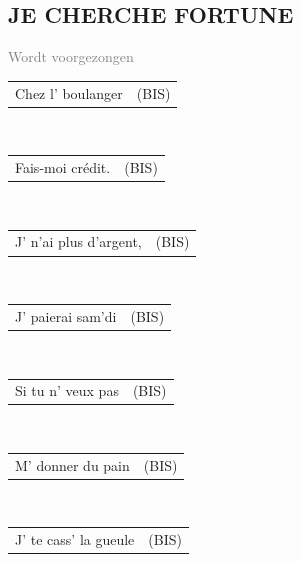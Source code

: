\documentclass[a4paper, 14pt]{extarticle}
\newcommand{\spacing}{2mm}
\begin{document}
\subsection*{JE CHERCHE FORTUNE}
\textcolor{gray}{\small Wordt voorgezongen}
\par
\renewcommand{\spacing}{1mm}
\flushleft
\begin{tabularx}{0.8\textwidth}{>{\raggedright\arraybackslash}X | c}
    Chez l’ boulanger & (BIS)\\
\end{tabularx}\\
\vspace{\spacing}
\begin{tabularx}{0.8\textwidth}{>{\raggedright\arraybackslash}X | c}
    Fais-moi crédit. & (BIS)\\
\end{tabularx}\\
\vspace{\spacing}
\begin{tabularx}{0.8\textwidth}{>{\raggedright\arraybackslash}X | c}
    J’ n’ai plus d’argent, & (BIS)\\
\end{tabularx}\\
\vspace{\spacing}
\begin{tabularx}{0.8\textwidth}{>{\raggedright\arraybackslash}X | c}
    J’ paierai sam’di & (BIS)\\
\end{tabularx}\\
\vspace{\spacing}
\begin{tabularx}{0.8\textwidth}{>{\raggedright\arraybackslash}X | c}
    Si tu n’ veux pas & (BIS)\\
\end{tabularx}\\
\vspace{\spacing}
\begin{tabularx}{0.8\textwidth}{>{\raggedright\arraybackslash}X | c}
    M’ donner du pain & (BIS)\\
\end{tabularx}\\
\vspace{\spacing}
\begin{tabularx}{0.8\textwidth}{>{\raggedright\arraybackslash}X | c}
    J’ te cass’ la gueule & (BIS)\\
\end{tabularx}\\
\end{document}
